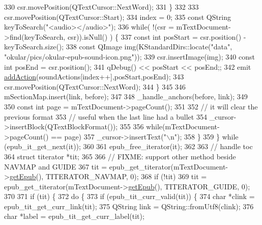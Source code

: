 \begin{DoxyCode}
{{330         csr.movePosition(QTextCursor::NextWord);
331       \}
332 
333       csr.movePosition(QTextCursor::Start);
334       index = 0;
335       \textcolor{keyword}{const} QString keyToSearch(\textcolor{stringliteral}{"<audio></audio>"});
336       \textcolor{keywordflow}{while}( !(csr = mTextDocument->find(keyToSearch, csr)).isNull() ) \{
337         \textcolor{keyword}{const} \textcolor{keywordtype}{int} posStart = csr.position() - keyToSearch.size();
338         \textcolor{keyword}{const} QImage img(KStandardDirs::locate(\textcolor{stringliteral}{"data"}, \textcolor{stringliteral}{"okular/pics/okular-epub-sound-icon.png"}));
339         csr.insertImage(img);
340         \textcolor{keyword}{const} \textcolor{keywordtype}{int} posEnd = csr.position();
341         qDebug() << posStart << posEnd;;
342         emit \hyperlink{classOkular_1_1TextDocumentConverter_ac4f1b668547e87affede3663ea6d8bc6}{addAction}(soundActions[index++],posStart,posEnd);
343         csr.movePosition(QTextCursor::NextWord);
344       \}
345 
346       mSectionMap.insert(link, before);
347 
348       \_handle\_anchors(before, link);
349 
350       \textcolor{keyword}{const} \textcolor{keywordtype}{int} page = mTextDocument->pageCount();
351 
352       \textcolor{comment}{// it will clear the previous format}
353       \textcolor{comment}{// useful when the last line had a bullet}
354       \_cursor->insertBlock(QTextBlockFormat());
355 
356       \textcolor{keywordflow}{while}(mTextDocument->pageCount() == page)
357         \_cursor->insertText(\textcolor{stringliteral}{"\(\backslash\)n"});
358     \}
359   \} \textcolor{keywordflow}{while} (epub\_it\_get\_next(it));
360 
361   epub\_free\_iterator(it);
362 
363   \textcolor{comment}{// handle toc}
364   \textcolor{keyword}{struct }titerator *tit;
365 
366   \textcolor{comment}{// FIXME: support other method beside NAVMAP and GUIDE}
367   tit = epub\_get\_titerator(mTextDocument->\hyperlink{classEpub_1_1EpubDocument_a37cb6d97564a7764b22e44523889267e}{getEpub}(), TITERATOR\_NAVMAP, 0);
368   \textcolor{keywordflow}{if} (!tit)
369     tit = epub\_get\_titerator(mTextDocument->\hyperlink{classEpub_1_1EpubDocument_a37cb6d97564a7764b22e44523889267e}{getEpub}(), TITERATOR\_GUIDE, 0);
370 
371   \textcolor{keywordflow}{if} (tit) \{
372     \textcolor{keywordflow}{do} \{
373       \textcolor{keywordflow}{if} (epub\_tit\_curr\_valid(tit)) \{
374         \textcolor{keywordtype}{char} *clink = epub\_tit\_get\_curr\_link(tit);
375         QString link = QString::fromUtf8(clink);
376         \textcolor{keywordtype}{char} *label = epub\_tit\_get\_curr\_label(tit);
}}
\end{DoxyCode}
